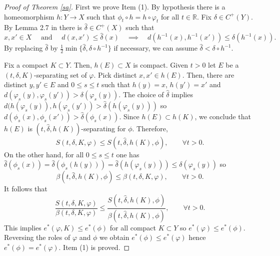 \documentclass[11pt,letterpaper]{amsart}
\begin{document}
\begin{proof}[Proof of Theorem \ref{sa}]
First we prove Item (1).
By hypothesis there is a homeomorphism $h:Y\to X$ such that $\phi_t\circ h=h\circ \varphi_t$ for all $t\in\mathbb{R}$.
Fix $\delta\in C^+(Y)$. By Lemma 2.7 in \cite{lny} there is $\hat{\delta}\in C^+(X)$ such that
$$
x,x'\in X\quad\mbox{ and }\quad d(x,x')\leq \hat{\delta}(x)\quad\implies\quad d(h^{-1}(x),h^{-1}(x'))\leq \delta(h^{-1}(x)).
$$
By replacing $\hat{\delta}$ by $\frac{1}2\min\{\hat{\delta}, \delta\circ h^{-1}\}$ if necessary, we can assume $\hat{\delta}< \delta\circ h^{-1}$.

Fix a compact $K\subset Y$. Then, $h(E)\subset X$ is compact.
Given $t>0$ let $E$ be a $(t,\delta,K)$-separating set of $\varphi$.
Pick distinct $x,x'\in h(E)$. Then, there are distinct $y,y'\in E$ and $0\leq s\leq t$ such that $h(y)=x$, $h(y')=x'$ and $d(\varphi_s(y),\varphi_s(y'))>\delta(\varphi_s(y))$.
The choice of $\hat{\delta}$ implies
$d(h(\varphi_s(y)),h(\varphi_s(y'))>\hat{\delta}(h(\varphi_s(y)))$
so $d(\phi_s(x),\phi_s(x'))>\hat{\delta}(\phi_s(x))$.
Since $h(E)\subset h(K)$, we conclude that $h(E)$ is $(t,\hat{\delta},h(K))$-separating for $\phi$. Therefore,
$$
S(t,\delta,K,\varphi)\leq S(t,\hat{\delta},h(K),\phi),\quad\quad\forall t>0.
$$
On the other hand, for all $0\leq s\leq t$ one has
$\hat{\delta}(\phi_s(x))=\hat{\delta}(\phi_s(h(y)))=\hat{\delta}(h(\varphi_s(y)))\leq \delta(\varphi_s(y))$ so
$$
\beta(t,\hat{\delta},h(K),\phi)\leq \beta(t,\delta,K,\varphi),\quad\quad\forall t>0.
$$
It follows that
$$
\frac{S(t,\delta,K,\varphi)}{\beta(t,\delta,K,\varphi)}\leq \frac{S(t,\hat{\delta},h(K),\phi)}{\beta(t,\hat{\delta},h(K),\phi)},\quad\quad\forall t>0.
$$
This implies $e^*(\varphi,K)\leq e^*(\phi)$ for all compact $K\subset Y$
so $e^*(\varphi)\leq e^*(\phi)$. Reversing the roles of $\varphi$ and $\phi$ we obtain
$e^*(\phi)\leq e^*(\varphi)$ hence $e^*(\phi)=e^*(\varphi)$.
Item (1) is proved.


\end{proof}
\end{document}

